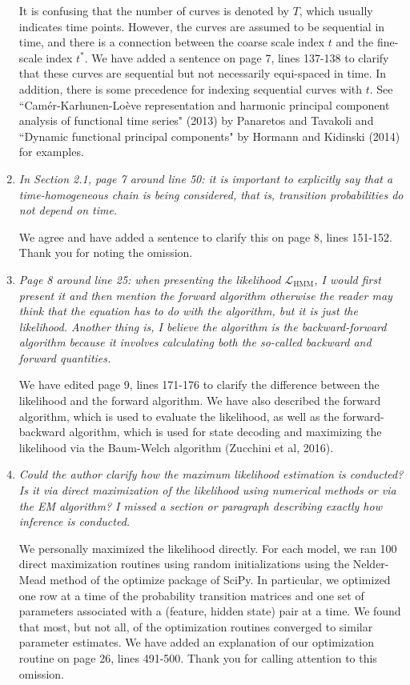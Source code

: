 \documentclass{article}
\begin{document}
\begin{enumerate}
    It is confusing that the number of curves is denoted by $T$, which usually indicates time points. However, the curves are assumed to be sequential in time, and there is a connection between the coarse scale index $t$ and the fine-scale index $t^*$. We have added a sentence on page 7, lines 137-138 to clarify that these curves are sequential but not necessarily equi-spaced in time. In addition, there is some precedence for indexing sequential curves with $t$. See ``Cam\'er-Karhunen-Lo\`eve representation and harmonic principal component analysis of functional time series" (2013) by Panaretos and Tavakoli and ``Dynamic functional principal components" by Hormann and Kidinski (2014) for examples.
    
    \item \textit{In Section 2.1, page 7 around line 50: it is important to explicitly say that a time-homogeneous chain is being considered, that is, transition probabilities do not depend on time.}
    
    We agree and have added a sentence to clarify this on page 8, lines 151-152. Thank you for noting the omission.
    
    \item \textit{Page 8 around line 25: when presenting the likelihood $\mathcal{L}_{\text{HMM}}$, I would first present it and then mention the forward algorithm otherwise the reader may think that the equation has to do with the algorithm, but it is just the likelihood. Another thing is, I believe the algorithm is the backward-forward algorithm because it involves calculating both the so-called backward and forward quantities.}
    
    We have edited page 9, lines 171-176 to clarify the difference between the likelihood and the forward algorithm. We have also described the forward algorithm, which is used to evaluate the likelihood, as well as the forward-backward algorithm, which is used for state decoding and maximizing the likelihood via the Baum-Welch algorithm (Zucchini et al, 2016).
    
    \item \textit{Could the author clarify how the maximum likelihood estimation is conducted? Is it via direct maximization of the likelihood using numerical methods or via the EM algorithm? I missed a section or paragraph describing exactly how inference is conducted. }
    
    We personally maximized the likelihood directly. For each model, we ran 100 direct maximization routines using random initializations using the Nelder-Mead method of the optimize package of SciPy. In particular, we optimized one row at a time of the probability transition matrices and one set of parameters associated with a (feature, hidden state) pair at a time. We found that most, but not all, of the optimization routines converged to similar parameter estimates. We have added an explanation of our optimization routine on page 26, lines 491-500. Thank you for calling attention to this omission.
    

\end{enumerate}
\end{document}
